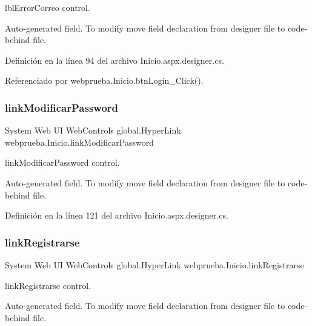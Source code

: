 lbl\+Error\+Correo control. 

Auto-\/generated field. To modify move field declaration from designer file to code-\/behind file. 

Definición en la línea 94 del archivo Inicio.\+aspx.\+designer.\+cs.



Referenciado por webprueba.\+Inicio.\+btn\+Login\+\_\+\+Click().

\mbox{\label{classwebprueba_1_1_inicio_aaed3ea21ca405b6d99aa55b3153f1f51}} 
\subsubsection{\texorpdfstring{linkModificarPassword}{linkModificarPassword}}
{\footnotesize\ttfamily System Web UI Web\+Controls global.\+Hyper\+Link webprueba.\+Inicio.\+link\+Modificar\+Password\hspace{0.3cm}{\ttfamily [protected]}}



link\+Modificar\+Password control. 

Auto-\/generated field. To modify move field declaration from designer file to code-\/behind file. 

Definición en la línea 121 del archivo Inicio.\+aspx.\+designer.\+cs.

\mbox{\label{classwebprueba_1_1_inicio_a057d09569d2ffa589dac3b0520ba7ec1}} 
\subsubsection{\texorpdfstring{linkRegistrarse}{linkRegistrarse}}
{\footnotesize\ttfamily System Web UI Web\+Controls global.\+Hyper\+Link webprueba.\+Inicio.\+link\+Registrarse\hspace{0.3cm}{\ttfamily [protected]}}



link\+Registrarse control. 

Auto-\/generated field. To modify move field declaration from designer file to code-\/behind file. 

